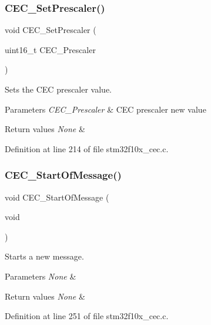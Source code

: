 \subsubsection{\texorpdfstring{C\+E\+C\+\_\+\+Set\+Prescaler()}{CEC\_SetPrescaler()}}
{\footnotesize\ttfamily void C\+E\+C\+\_\+\+Set\+Prescaler (\begin{DoxyParamCaption}\item[{uint16\+\_\+t}]{C\+E\+C\+\_\+\+Prescaler }\end{DoxyParamCaption})}



Sets the C\+EC prescaler value. 


\begin{DoxyParams}{Parameters}
{\em C\+E\+C\+\_\+\+Prescaler} & C\+EC prescaler new value \\
\hline
\end{DoxyParams}

\begin{DoxyRetVals}{Return values}
{\em None} & \\
\hline
\end{DoxyRetVals}


Definition at line 214 of file stm32f10x\+\_\+cec.\+c.

\mbox{\label{group___c_e_c___exported___functions_ga71e700461ffe7820d9e1c75da65fd0fb}} 
\subsubsection{\texorpdfstring{C\+E\+C\+\_\+\+Start\+Of\+Message()}{CEC\_StartOfMessage()}}
{\footnotesize\ttfamily void C\+E\+C\+\_\+\+Start\+Of\+Message (\begin{DoxyParamCaption}\item[{void}]{ }\end{DoxyParamCaption})}



Starts a new message. 


\begin{DoxyParams}{Parameters}
{\em None} & \\
\hline
\end{DoxyParams}

\begin{DoxyRetVals}{Return values}
{\em None} & \\
\hline
\end{DoxyRetVals}


Definition at line 251 of file stm32f10x\+\_\+cec.\+c.


